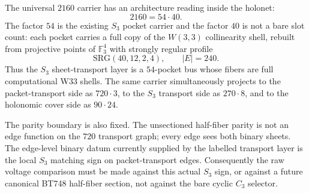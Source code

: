 \makeatletter
{}
\makeatother

\begin{theorem}
\label{thm:nonabelian-pocket-shell-bus}
The universal $2160$ carrier has an architecture reading inside the holonet:
\[
  2160 = 54\cdot 40.
\]
The factor $54$ is the existing $S_3$ pocket carrier and the factor $40$ is not a
bare slot count: each pocket carries a full copy of the $W(3,3)$ collinearity
shell, rebuilt from projective points of $\mathbb F_3^4$ with strongly regular
profile
\[
  \mathrm{SRG}(40,12,2,4),\qquad |E|=240.
\]
Thus the $S_3$ sheet-transport layer is a $54$-pocket bus whose fibers are full
computational W33 shells.  The same carrier simultaneously projects to the
packet-transport side as $720\cdot3$, to the $S_3$ transport side as $270\cdot8$,
and to the holonomic cover side as $90\cdot24$.

The parity boundary is also fixed.  The unsectioned half-fiber parity is not an
edge function on the $720$ transport graph; every edge sees both binary sheets.
The edge-level binary datum currently supplied by the labelled transport layer is
the local $S_3$ matching sign on packet-transport edges.  Consequently the raw
voltage comparison must be made against this actual $S_3$ sign, or against a
future canonical BT748 half-fiber section, not against the bare cyclic $C_3$
selector.
\end{theorem}

